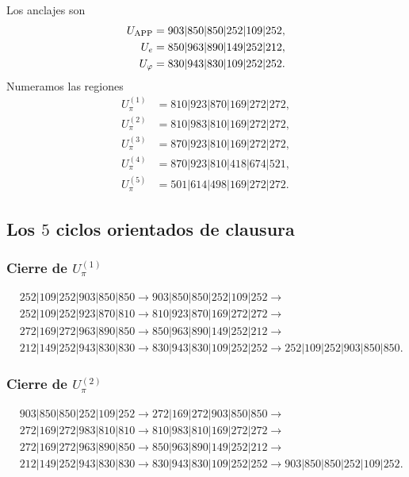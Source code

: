 Los anclajes son
\[
\begin{aligned}
U_{\rm APP}&=903|850|850|252|109|252,\\
U_e&=850|963|890|149|252|212,\\
U_\varphi&=830|943|830|109|252|252.
\end{aligned}
\]
Numeramos las regiones
\[
\begin{aligned}
U_\pi^{(1)}&=810|923|870|169|272|272,\\
U_\pi^{(2)}&=810|983|810|169|272|272,\\
U_\pi^{(3)}&=870|923|810|169|272|272,\\
U_\pi^{(4)}&=870|923|810|418|674|521,\\
U_\pi^{(5)}&=501|614|498|169|272|272.
\end{aligned}
\]

\subsection{Los \(5\) ciclos orientados de clausura}

\subsubsection{Cierre de \texorpdfstring{\(U_\pi^{(1)}\)}{U-pi 1}}
\begin{align*}
&252|109|252|903|850|850\to
903|850|850|252|109|252\to\\
&252|109|252|923|870|810\to
810|923|870|169|272|272\to\\
&272|169|272|963|890|850\to
850|963|890|149|252|212\to\\
&212|149|252|943|830|830\to
830|943|830|109|252|252\to
252|109|252|903|850|850.
\end{align*}

\subsubsection{Cierre de \texorpdfstring{\(U_\pi^{(2)}\)}{U-pi 2}}
\begin{align*}
&903|850|850|252|109|252\to
272|169|272|903|850|850\to\\
&272|169|272|983|810|810\to
810|983|810|169|272|272\to\\
&272|169|272|963|890|850\to
850|963|890|149|252|212\to\\
&212|149|252|943|830|830\to
830|943|830|109|252|252\to
903|850|850|252|109|252.
\end{align*}

